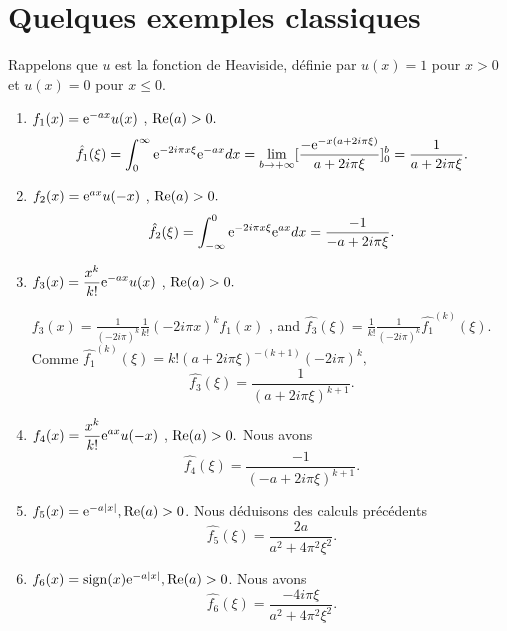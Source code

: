 \section{Quelques exemples classiques}
Rappelons que  $u$ est la fonction de Heaviside, d\'efinie par $u(x)=1$ pour $x>0$ et $u(x)=0$ pour $x\leq 0$.
\begin{enumerate}[label=(\roman*)]
\item $f_{1}(x)=\mathrm{e}^{-ax}u(x)$ , ${\rm Re}(a)>0.$
$$
\hat{f_{1}}(\xi)=\int_{0}^{\infty}\mathrm{e}^{-2i\pi x\xi}\mathrm{e}^{-ax}dx=\lim_{b\rightarrow+\infty}[\frac{-\mathrm{e}^{-x(a+2i\pi\xi)}}{a+2i\pi\xi}]_{0}^{b}=\frac{1}{a+2i\pi\xi}.
$$
\item $f_{2}(x)=\mathrm{e}^{ax}u(-x)$ , ${\rm Re}(a)>0.$
$$
\hat{f_{2}}(\xi)=\int_{-\infty}^{0}\mathrm{e}^{-2i\pi x\xi}\mathrm{e}^{ax}dx=\frac{-1}{-a+2i\pi\xi}.
$$
\item $f_{3}(x)=\displaystyle \frac{x^{k}}{k!}\mathrm{e}^{-ax}u(x)$ , ${\rm Re}(a)>0.$

$f_{3}(x)=\displaystyle \frac{1}{(-2i\pi)^{k}}\frac{1}{k!}(-2i\pi x)^{k}f_{1}(x)$ , and $\displaystyle \hat{f_{3}}(\xi)=\frac{1}{k!}\frac{1}{(-2i\pi)^{k}}\hat{f_{1}}^{(k)}(\xi)$. Comme $\hat{f_{1}}^{(k)}(\xi)=k!(a+2i\pi\xi)^{-(k+1)}(-2i\pi)^{k},$
$$
\hat{f_{3}}(\xi)=\frac{1}{(a+2i\pi\xi)^{k+1}}.
$$
\item $f_{4}(x)=\displaystyle \frac{x^{k}}{k!}\mathrm{e}^{ax}u(-x)$ , ${\rm Re}(a)>0.$
Nous avons
$$
\hat{f_{4}}(\xi)=\frac{-1}{(-a+2i\pi\xi)^{k+1}}.
$$
\item $f_{5}(x)=\mathrm{e}^{-a|x|}, {\rm Re}(a)>0$. Nous d\'eduisons des calculs pr\'ec\'edents
$$
\hat{f_{5}}(\xi)=\frac{2a}{a^{2}+4\pi^{2}\xi^{2}}.
$$
\item $f_{6}(x)=\mathrm{sign}(x)\mathrm{e}^{-a|x|}, {\rm Re}(a)>0$. Nous avons
$$
\hat{f_{6}}(\xi)=\frac{-4i\pi\xi}{a^{2}+4\pi^{2}\xi^{2}}.
$$
\end{enumerate}
